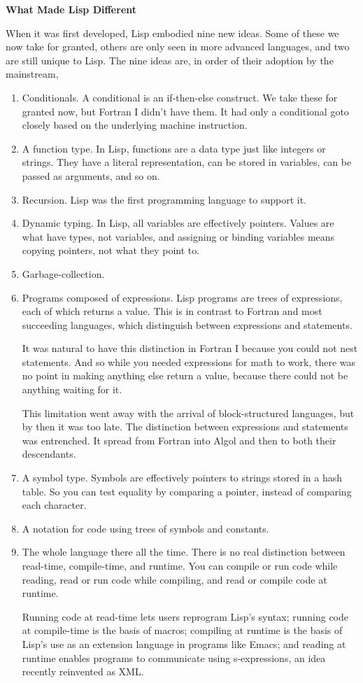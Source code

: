 \documentclass[12pt]{book}
\begin{document}
\textbf{What Made Lisp Different}

When it was first developed, Lisp embodied nine new ideas. Some of these
we now take for granted, others are only seen in more advanced
languages, and two are still unique to Lisp. The nine ideas are, in
order of their adoption by the mainstream,

\begin{enumerate}
\def\labelenumi{\arabic{enumi}.}
\item
  Conditionals. A conditional is an if-then-else construct. We take
  these for granted now, but Fortran I didn't have them. It had only a
  conditional goto closely based on the underlying machine instruction.
\item
  A function type. In Lisp, functions are a data type just like integers
  or strings. They have a literal representation, can be stored in
  variables, can be passed as arguments, and so on.
\item
  Recursion. Lisp was the first programming language to support it.
\item
  Dynamic typing. In Lisp, all variables are effectively pointers.
  Values are what have types, not variables, and assigning or binding
  variables means copying pointers, not what they point to.
\item
  Garbage-collection.
\item
  Programs composed of expressions. Lisp programs are trees of
  expressions, each of which returns a value. This is in contrast to
  Fortran and most succeeding languages, which distinguish between
  expressions and statements.

  It was natural to have this distinction in Fortran I because you could
  not nest statements. And so while you needed expressions for math to
  work, there was no point in making anything else return a value,
  because there could not be anything waiting for it.

  This limitation went away with the arrival of block-structured
  languages, but by then it was too late. The distinction between
  expressions and statements was entrenched. It spread from Fortran into
  Algol and then to both their descendants.
\item
  A symbol type. Symbols are effectively pointers to strings stored in a
  hash table. So you can test equality by comparing a pointer, instead
  of comparing each character.
\item
  A notation for code using trees of symbols and constants.
\item
  The whole language there all the time. There is no real distinction
  between read-time, compile-time, and runtime. You can compile or run
  code while reading, read or run code while compiling, and read or
  compile code at runtime.

  Running code at read-time lets users reprogram Lisp's syntax; running
  code at compile-time is the basis of macros; compiling at runtime is
  the basis of Lisp's use as an extension language in programs like
  Emacs; and reading at runtime enables programs to communicate using
  s-expressions, an idea recently reinvented as XML.
\end{enumerate}
\end{document}
